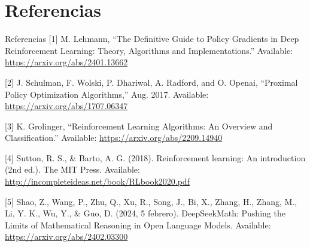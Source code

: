 \documentclass[10pt]{beamer}
\begin{document}


\section{Referencias}

\begin{frame}{Referencias}
	[1] M. Lehmann, “The Definitive Guide to Policy Gradients in Deep Reinforcement Learning: Theory, Algorithms and Implementations.” Available: \url{https://arxiv.org/abs/2401.13662}
	\vspace{0.3 cm}

	[2] J. Schulman, F. Wolski, P. Dhariwal, A. Radford, and O. Openai, “Proximal Policy Optimization Algorithms,” Aug. 2017. Available: \url{https://arxiv.org/abs/1707.06347}
	\vspace{0.3 cm}

	[3] K. Grolinger, “Reinforcement Learning Algorithms: An Overview and Classification.” Available: \url{https://arxiv.org/abs/2209.14940}
	\vspace{0.3 cm}

	[4] Sutton, R. S., \& Barto, A. G. (2018). Reinforcement learning: An introduction (2nd ed.). The MIT Press. Available: \url{http://incompleteideas.net/book/RLbook2020.pdf}
	\vspace{0.3 cm}

	[5] Shao, Z., Wang, P., Zhu, Q., Xu, R., Song, J., Bi, X., Zhang, H., Zhang, M., Li, Y. K., Wu, Y., \& Guo, D. (2024, 5 febrero). DeepSeekMath: Pushing the Limits of Mathematical Reasoning in Open Language Models. Available: \url{https://arxiv.org/abs/2402.03300}
\end{frame}
\end{document}
